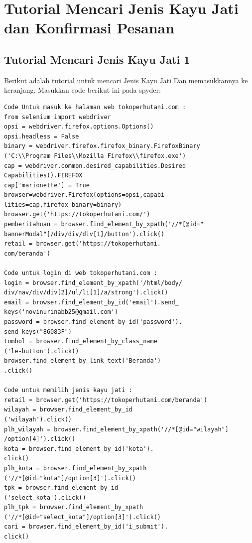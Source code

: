 \newpage
\section{Tutorial Mencari Jenis Kayu Jati dan Konfirmasi Pesanan }

\subsection{Tutorial Mencari Jenis Kayu Jati 1}
Berikut adalah tutorial untuk mencari Jenis Kayu Jati Dan memasukkannya ke keranjang. Masukkan code berikut ini pada spyder:
\begin{verbatim}
Code Untuk masuk ke halaman web tokoperhutani.com :
from selenium import webdriver
opsi = webdriver.firefox.options.Options()
opsi.headless = False
binary = webdriver.firefox.firefox_binary.FirefoxBinary
('C:\\Program Files\\Mozilla Firefox\\firefox.exe')
cap = webdriver.common.desired_capabilities.Desired
Capabilities().FIREFOX
cap['marionette'] = True
browser=webdriver.Firefox(options=opsi,capabi
lities=cap,firefox_binary=binary)
browser.get('https://tokoperhutani.com/')
pemberitahuan = browser.find_element_by_xpath('//*[@id="
bannerModal"]/div/div/div[1]/button').click()
retail = browser.get('https://tokoperhutani.
com/beranda')

Code untuk login di web tokoperhutani.com :
login = browser.find_element_by_xpath('/html/body/
div/nav/div/div[2]/ul/li[1]/a/strong').click()
email = browser.find_element_by_id('email').send_
keys('novinurinabb25@gmail.com')
password = browser.find_element_by_id('password').
send_keys("86083F")
tombol = browser.find_element_by_class_name
('le-button').click()
browser.find_element_by_link_text('Beranda')
.click()

Code untuk memilih jenis kayu jati :
retail = browser.get('https://tokoperhutani.com/beranda')
wilayah = browser.find_element_by_id
('wilayah').click()
plh_wilayah = browser.find_element_by_xpath('//*[@id="wilayah"]
/option[4]').click()
kota = browser.find_element_by_id('kota').
click()
plh_kota = browser.find_element_by_xpath
('//*[@id="kota"]/option[3]').click()
tpk = browser.find_element_by_id
('select_kota').click()
plh_tpk = browser.find_element_by_xpath
('//*[@id="select_kota"]/option[3]').click()
cari = browser.find_element_by_id('i_submit').
click()
\end{verbatim}

